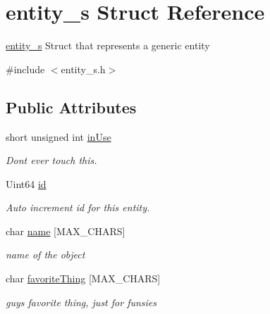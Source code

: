 \hypertarget{structentity__s}{}\section{entity\+\_\+s Struct Reference}
\label{structentity__s}


\hyperlink{structentity__s}{entity\+\_\+s} Struct that represents a generic entity  




{\ttfamily \#include $<$entity\+\_\+s.\+h$>$}

\subsection*{Public Attributes}
\begin{DoxyCompactItemize}
\item 
short unsigned int \hyperlink{structentity__s_ac630363dd06e4f209dfa9b3197f95fc4}{in\+Use}
\begin{DoxyCompactList}\small\item\em Don\textquotesingle{}t ever touch this. \end{DoxyCompactList}\item 
\mbox{\label{structentity__s_ac954e51ff4ac8ad08753d7b8a9594c3e}} 
Uint64 \hyperlink{structentity__s_ac954e51ff4ac8ad08753d7b8a9594c3e}{id}
\begin{DoxyCompactList}\small\item\em Auto increment id for this entity. \end{DoxyCompactList}\item 
\mbox{\label{structentity__s_ae94942d1d88595805222e57c4c5254a0}} 
char \hyperlink{structentity__s_ae94942d1d88595805222e57c4c5254a0}{name} \mbox{[}M\+A\+X\+\_\+\+C\+H\+A\+RS\mbox{]}
\begin{DoxyCompactList}\small\item\em name of the object \end{DoxyCompactList}\item 
\mbox{\label{structentity__s_ae22b0ebb779e7ab47426fa4517cb4289}} 
char \hyperlink{structentity__s_ae22b0ebb779e7ab47426fa4517cb4289}{favorite\+Thing} \mbox{[}M\+A\+X\+\_\+\+C\+H\+A\+RS\mbox{]}
\begin{DoxyCompactList}\small\item\em guy\textquotesingle{}s favorite thing, just for funsies \end{DoxyCompactList}\item 

\end{DoxyCompactItemize}
